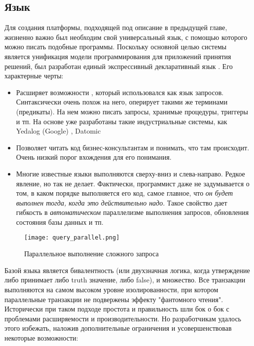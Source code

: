 \subsection{Язык \logiql}
\label{sec:technology:logiql}

Для создания платформы, подходящей под описание в предыдущей главе, жизненно важно был необходим свой универсальный язык, с помощью которого можно писать подобные программы. Поскольку основной целью системы является унификация модели программирования для приложений принятия решений, был  разработан единый экспрессивный декларативный  язык \logiql. Его характерные черты:

\begin{itemize}
  \item Расширяет возможности \datalog, который использовался как язык запросов. Синтаксически очень похож на него, оперирует такими же терминами (предикаты). На нем можно писать запросы, хранимые процедуры, триггеры и тп. На основе \datalog уже разработаны такие индустриальные системы, как Yedalog (Google) \cite{yedalog}, Datomic \cite{datomic}
  \item Позволяет читать код бизнес-консультантам и понимать, что там происходит. Очень низкий порог вхождения для его понимания.
  \item Многие известные языки выполняются сверху-вниз и слева-направо. Редкое явление, но \logiql так не делает. Фактически, программист даже не задумывается о том, в каком порядке выполняется его код, самое главное, что \emph{он будет выполнен тогда, когда это действительно надо}. Такое свойство дает гибкость в \emph{автоматическом} параллелизме выполнения запросов, обновления состояния базы данных и тп.
\end{itemize}

\begin{figure}
	\centering
	\texttt{[image: query\_parallel.png]}
	\caption{Параллельное выполнение сложного запроса \cite{query_parallel_execution}}
	\label{fig:technology:logiql:query_parallel}
\end{figure}

Базой языка является бивалентность (или двухзначная логика, когда утверждение либо принимает либо truth значение, либо false), и множество. Все транзакции выполняются на самом высоком уровне изолированности, при котором параллельные транзакции не подвержены эффекту "фантомного чтения". Исторически при таком подходе простота и правильность шли бок о бок с проблемами расширяемости и производительности. Но разработчикам \logiql удалось этого избежать, наложив дополнительные ограничения и усовершенствовав некоторые возможности:

